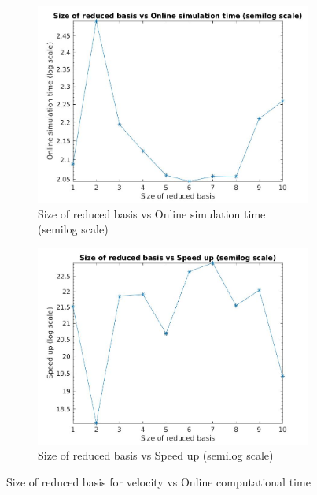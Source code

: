 \documentclass[graybox]{svmult}
\begin{document}
\begin{figure}
\begin{subfigure}{0.48\textwidth}
\includegraphics[width=\linewidth]{size_vs_online_simulation_time_semilog.jpg}
\caption{Size of reduced basis vs Online simulation time (semilog scale)} \label{online_simulation_time_vs_basis}
\end{subfigure}\hspace*{\fill}
\begin{subfigure}{0.48\textwidth}
\includegraphics[width=\linewidth]{size_vs_reduced_basis_semilog.jpg}
\caption{Size of reduced basis vs Speed up (semilog scale)} \label{time_vs_speedup}
\end{subfigure}
\caption{Size of reduced basis for velocity vs Online computational time} 
\label{basis_vs_time}
\end{figure}
\end{document}
